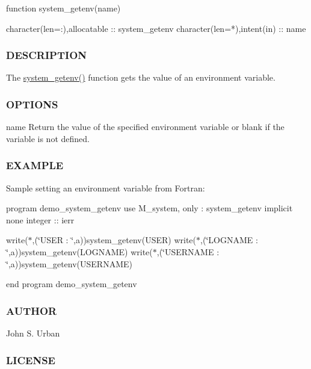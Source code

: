 \begin{DoxyVerb}function system_getenv(name)

 character(len=:),allocatable   :: system_getenv
 character(len=*),intent(in)    :: name
\end{DoxyVerb}


\subsubsection*{D\+E\+S\+C\+R\+I\+P\+T\+I\+ON}

The \mbox{\hyperlink{namespacem__system_a15f307db605f8b332d4213814c0fb1a9}{system\+\_\+getenv()}} function gets the value of an environment variable.

\subsubsection*{O\+P\+T\+I\+O\+NS}

name Return the value of the specified environment variable or blank if the variable is not defined.

\subsubsection*{E\+X\+A\+M\+P\+LE}

Sample setting an environment variable from Fortran\+:

program demo\+\_\+system\+\_\+getenv use M\+\_\+system, only \+: system\+\_\+getenv implicit none integer \+:\+: ierr

write($\ast$,\textquotesingle{}(\char`\"{}\+U\+S\+E\+R     \+: \char`\"{},a)\textquotesingle{})system\+\_\+getenv(\textquotesingle{}U\+S\+ER\textquotesingle{}) write($\ast$,\textquotesingle{}(\char`\"{}\+L\+O\+G\+N\+A\+M\+E  \+: \char`\"{},a)\textquotesingle{})system\+\_\+getenv(\textquotesingle{}L\+O\+G\+N\+A\+ME\textquotesingle{}) write($\ast$,\textquotesingle{}(\char`\"{}\+U\+S\+E\+R\+N\+A\+M\+E \+: \char`\"{},a)\textquotesingle{})system\+\_\+getenv(\textquotesingle{}U\+S\+E\+R\+N\+A\+ME\textquotesingle{})

end program demo\+\_\+system\+\_\+getenv

\subsubsection*{A\+U\+T\+H\+OR}

John S. Urban \subsubsection*{L\+I\+C\+E\+N\+SE}

